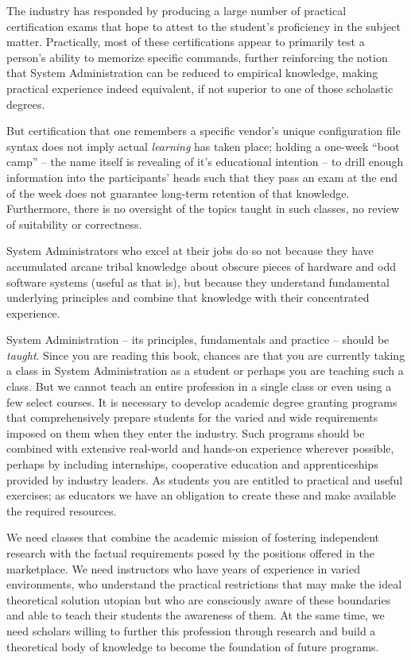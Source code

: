 The industry has responded by producing a large number
of practical certification exams that hope to attest
to the student's proficiency in the subject matter.
Practically, most of these certifications appear to
primarily test a person's ability to memorize specific
commands, further reinforcing the notion that System
Administration can be reduced to empirical knowledge,
making practical experience indeed equivalent, if not
superior to one of those scholastic degrees.

But certification that one remembers a specific
vendor's unique configuration file syntax does not
imply actual {\em learning} has taken place; holding a
one-week ``boot camp'' -- the name itself is revealing
of it's educational intention --  to drill enough
information into the participants' heads such that
they pass an exam at the end of the week does not
guarantee long-term retention of that knowledge.
Furthermore, there is no oversight of the topics
taught in such classes, no review of suitability or
correctness.

System Administrators who excel at their jobs do so
not because they have accumulated arcane tribal
knowledge about obscure pieces of hardware and odd
software systems (useful as that is), but because they
understand fundamental underlying principles and
combine that knowledge with their concentrated
experience.

System Administration -- its principles, fundamentals
and practice -- should be {\em taught}.  Since you are
reading this book, chances are that you are currently
taking a class in System Administration as a student
or perhaps you are teaching such a class.  But we
cannot teach an entire profession in a single class or
even using a few select courses.  It is necessary to
develop academic degree granting programs that
comprehensively prepare students for the varied and
wide requirements imposed on them when they enter the
industry.  Such programs should be combined with
extensive real-world and hands-on experience wherever
possible, perhaps by including internships,
cooperative education and apprenticeships provided by
industry leaders.  As students you are entitled to
practical and useful exercises; as educators we have an
obligation to create these and make available the
required resources.

We need classes that combine the academic mission of
fostering independent research with the factual
requirements posed by the positions offered in the
marketplace.  We need instructors who have years of
experience in varied environments, who understand the
practical restrictions that may make the ideal
theoretical solution utopian but who are consciously
aware of these boundaries and able to teach their
students the awareness of them.  At the same time, we
need scholars willing to further this profession
through research and build a theoretical body of
knowledge to become the foundation of future programs.

